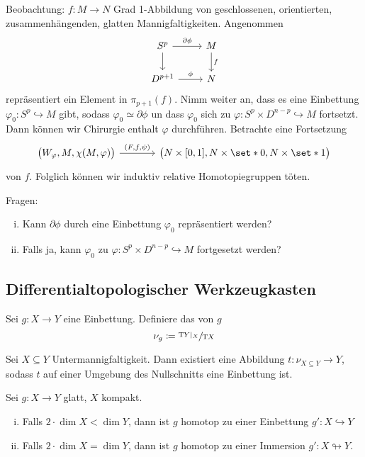 Beobachtung: $f \colon M \to N$ Grad 1-Abbildung von geschlossenen, orientierten, zusammenhängenden, glatten Mannigfaltigkeiten.
Angenommen
\[
	\begin{tikzcd}
		S^p \rar["\partial \phi"] \dar & M \dar["f"] \\
		D^{p+1} \rar["\phi"] & N
	\end{tikzcd}
\]
repräsentiert ein Element in $\pi_{p+1}(f)$.
Nimm weiter an, dass es eine Einbettung $\varphi_0\colon S^p \hookrightarrow M$ gibt, sodass $\varphi_0 \simeq \partial \phi$ un dass $\varphi_0$ sich zu $\varphi \colon S^p \times D^{n-p} \hookrightarrow M$ fortsetzt.
Dann können wir Chirurgie enthalt $\varphi$ durchführen.
Betrachte eine Fortsetzung
\[
	\begin{tikzcd}[sep=large]
		\enbrace[\big]{W_\varphi,M,\chi(M,\varphi)} \rar["{(F,f,\psi)}"] & \enbrace[\big]{N \times [0,1], N \times \set*{0}, N \times \set*{1}}
	\end{tikzcd}
\]
von $f$.
Folglich können wir induktiv relative Homotopiegruppen töten.

Fragen:
\begin{enumerate}[(i)]
	\item Kann $\partial \phi$ durch eine Einbettung $\varphi_0$ repräsentiert werden?
	\item Falls ja, kann $\varphi_0$ zu $\varphi \colon S^p \times D^{n-p} \hookrightarrow M$ fortgesetzt werden?
\end{enumerate}

\subsection*{Differentialtopologischer Werkzeugkasten}

\begin{definition}[{name=[{Normalenbündel}]}]
	Sei $g \colon X \to Y$ eine Einbettung.
	Definiere das  von $g$
	\[
		\nu_g \coloneqq \sfrac{\mathrm{T}\mkern-0.85mu Y|_X}{\mathrm{T}\mkern-0.85mu X}
	\] 
\end{definition}

\begin{satz}[{name={Existenz von Tubenumgebungen}}]
	Sei $X \subseteq Y$ Untermannigfaltigkeit.
	Dann existiert eine Abbildung $t \colon \nu_{X \subseteq Y} \to Y$, sodass $t$ auf einer Umgebung des Nullschnitts eine Einbettung ist.
\end{satz}

\begin{satz}[{name={Whitney}}]
	Sei $g \colon X\to Y$ glatt, $X$ kompakt.
	\begin{enumerate}[(i)]
		\item Falls $2 \cdot \dim X < \dim Y$, dann ist $g$ homotop zu einer Einbettung $g' \colon X \hookrightarrow Y$
		\item Falls $2 \cdot \dim X = \dim Y$, dann ist $g$ homotop zu einer Immersion $g' \colon X \looparrowright Y$.
	\end{enumerate}
\end{satz}

